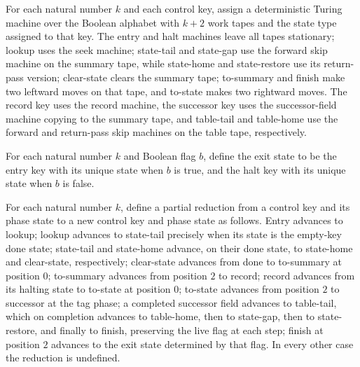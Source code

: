 \begin{definition}
\label{Turing.StepBlock.part}
\leanok
{}
For each natural number $k$ and each control key, assign a deterministic Turing machine
over the Boolean alphabet with $k+2$ work tapes and the state type assigned to that key.
The entry and halt machines leave all tapes stationary; lookup uses the seek machine;
state-tail and state-gap use the forward skip machine on the summary tape, while
state-home and state-restore use its return-pass version; clear-state clears the summary
tape; to-summary and finish make two leftward moves on that tape, and to-state makes two
rightward moves. The record key uses the record machine, the successor key uses the
successor-field machine copying to the summary tape, and table-tail and table-home use
the forward and return-pass skip machines on the table tape, respectively.
\end{definition}

\begin{definition}
\label{Turing.StepBlock.exit}
\leanok
{}
For each natural number $k$ and Boolean flag $b$, define the exit state to be the entry
key with its unique state when $b$ is true, and the halt key with its unique state when
$b$ is false.
\end{definition}

\begin{definition}
\label{Turing.StepBlock.red}
\leanok
{}
For each natural number $k$, define a partial reduction from a control key and its phase
state to a new control key and phase state as follows. Entry advances to lookup; lookup
advances to state-tail precisely when its state is the empty-key done state; state-tail
and state-home advance, on their done state, to state-home and clear-state,
respectively; clear-state advances from done to to-summary at position $0$; to-summary
advances from position $2$ to record; record advances from its halting state to to-state
at position $0$; to-state advances from position $2$ to successor at the tag phase; a
completed successor field advances to table-tail, which on completion advances to
table-home, then to state-gap, then to state-restore, and finally to finish, preserving
the live flag at each step; finish at position $2$ advances to the exit state determined
by that flag. In every other case the reduction is undefined.
\end{definition}

